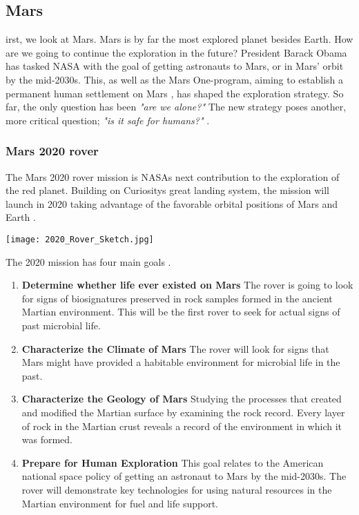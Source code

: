 \subsection{Mars}

irst, we look at Mars. 
Mars is by far the most explored planet besides Earth. 
How are we going to continue the exploration in the future?
President Barack Obama has tasked NASA with the goal of getting astronauts to Mars, or in Mars' orbit by the mid-2030s. 
This, as well as the Mars One-program, aiming to establish a permanent human settlement on Mars \cite{FPlan12}, has shaped the exploration strategy. 
So far, the only question has been \emph{"are we alone?"} 
The new strategy poses another, more critical question; \emph{"is it safe for humans?"} \cite{FPlan01}.

\subsubsection{Mars 2020 rover}

The Mars 2020 rover mission is NASAs next contribution to the exploration of the red planet. 
Building on Curiositys great landing system, the mission will launch in 2020 taking advantage of the favorable orbital positions of Mars and Earth \cite{FPlan14}. 

\begin{center}
	\texttt{[image: 2020\_Rover\_Sketch.jpg]}
\end{center}
The 2020 mission has four main goals \cite{FPlan13}.

\begin{enumerate}
	\item \textbf{Determine whether life ever existed on Mars}
The rover is going to look for signs of biosignatures preserved in rock samples formed in the ancient Martian environment.
This will be the first rover to seek for actual signs of past microbial life.
	\item \textbf{Characterize the Climate of Mars}
The rover will look for signs that Mars might have provided a habitable environment for microbial life in the past. 
	\item \textbf{Characterize the Geology of Mars}
Studying the processes that created and modified the Martian surface by examining the rock record.
Every layer of rock in the Martian crust reveals a record of the environment in which it was formed.
	\item \textbf{Prepare for Human Exploration}
This goal relates to the American national space policy of getting an astronaut to Mars by the mid-2030s.
The rover will demonstrate key technologies for using natural resources in the Martian environment for fuel and life support. 
\end{enumerate}

